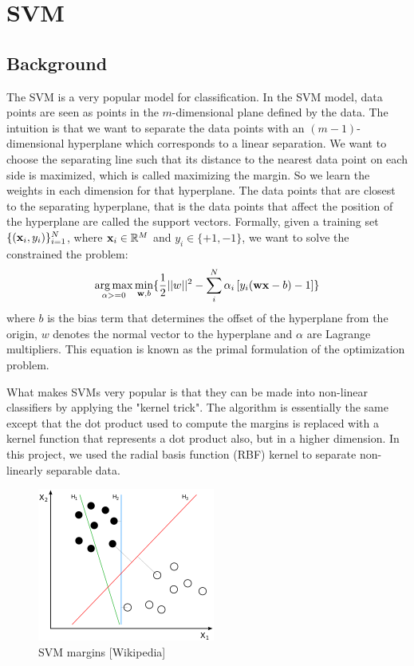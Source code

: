 \documentclass[11pt,letterpaper]{article}
\DeclareMathOperator*{\argmax}{arg\,max}
\newcommand{\vw}{{\bf w}}
\newcommand{\vx}{{\bf x}}
\newcommand{\valpha}{{\bf \alpha}}
\newcommand{\vxi}{{\bf x}_i}
\newcommand{\yi}{y_i}
\begin{document}
\section{SVM}

\subsection{Background}
	The SVM is a very popular model for classification. In the SVM model, data points are seen as points in the $m$-dimensional plane defined by the data. The intuition is that we want to separate the data points with an $(m-1)$-dimensional hyperplane which corresponds to a linear separation. We want to choose the separating line such that its distance to the nearest data point on each side is maximized, which is called maximizing the margin. So we learn the weights in each dimension for that hyperplane. The data points that are closest to the separating hyperplane, that is the data points that affect the position of the hyperplane are called the support vectors. Formally, given a training set $\{(\vxi,\yi)\}_{i=1}^N$, where $\vx_i \in \mathbb{R}^M$ and $y_i \in\{+1,-1\}$, we want to solve the constrained the problem:
\begin{align}
\argmax_{\valpha >= 0} \min_{\vw,b} \{ \frac{1}{2} ||w||^2  - \sum_i^N \alpha_i\left[\yi(\vw \vx - b) - 1\right]  \}
\end{align}
where $b$ is the bias term that determines the offset of the hyperplane from the origin, $w$ denotes the normal vector to the hyperplane and $\alpha$ are Lagrange multipliers. This equation is known as the primal formulation of the optimization problem.

What makes SVMs very popular is that they can be made into non-linear classifiers by applying the "kernel trick". The algorithm is essentially the same except that the dot product used to compute the margins is replaced with a kernel function that represents a dot product also, but in a higher dimension. In this project, we used the radial basis function (RBF) kernel to separate non-linearly separable data.

\begin{figure}
\includegraphics[scale=1]{images/Svm_separating_hyperplanes.PNG}
\caption{SVM margins [Wikipedia]}
\end{figure}
\end{document}
